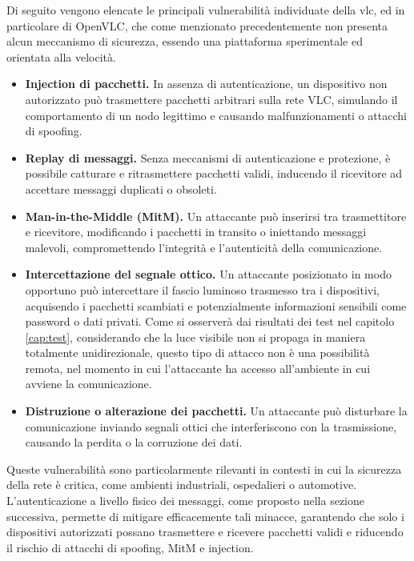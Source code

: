 Di seguito vengono elencate le principali vulnerabilità individuate della \gls{vlc}, ed in particolare di OpenVLC, che come menzionato precedentemente non presenta alcun meccanismo di sicurezza, essendo una piattaforma sperimentale ed orientata alla velocità.

\begin{itemize}
    \item \textbf{Injection di pacchetti.} In assenza di autenticazione, un dispositivo non autorizzato può trasmettere pacchetti arbitrari sulla rete VLC, simulando il comportamento di un nodo legittimo e causando malfunzionamenti o attacchi di spoofing.
    \item \textbf{Replay di messaggi.} Senza meccanismi di autenticazione e protezione, è possibile catturare e ritrasmettere pacchetti validi, inducendo il ricevitore ad accettare messaggi duplicati o obsoleti.
    \item \textbf{Man-in-the-Middle (MitM).} Un attaccante può inserirsi tra trasmettitore e ricevitore, modificando i pacchetti in transito o iniettando messaggi malevoli, compromettendo l'integrità e l'autenticità della comunicazione.
    \item \textbf{Intercettazione del segnale ottico.} Un attaccante posizionato in modo opportuno può intercettare il fascio luminoso trasmesso tra i dispositivi, acquisendo i pacchetti scambiati e potenzialmente informazioni sensibili come password o dati privati. Come si osserverà dai risultati dei test nel capitolo \ref{cap:test}, considerando che la luce visibile non si propaga in maniera totalmente unidirezionale, questo tipo di attacco non è una possibilità remota, nel momento in cui l'attaccante ha accesso all'ambiente in cui avviene la comunicazione.
    \item \textbf{Distruzione o alterazione dei pacchetti.} Un attaccante può disturbare la comunicazione inviando segnali ottici che interferiscono con la trasmissione, causando la perdita o la corruzione dei dati.
\end{itemize}

\noindent Queste vulnerabilità sono particolarmente rilevanti in contesti in cui la sicurezza della rete è critica, come ambienti industriali, ospedalieri o automotive. L'autenticazione a livello fisico dei messaggi, come proposto nella sezione successiva, permette di mitigare efficacemente tali minacce, garantendo che solo i dispositivi autorizzati possano trasmettere e ricevere pacchetti validi e riducendo il rischio di attacchi di spoofing, MitM e injection.

